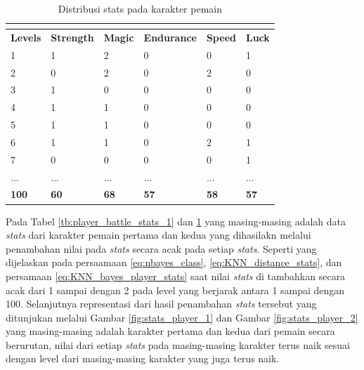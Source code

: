 \begin{longtable}{|l|l|l|l|l|l|}
	\caption{Distribusi stats pada karakter pemain}
	\vspace{1ex}
	\label{tb:player_battle_stats_2}\\
	\hline
	\rowcolor[HTML]{C0C0C0} 
	\textbf{Levels} & \textbf{Strength} & \textbf{Magic} & \textbf{Endurance} & \textbf{Speed} & \textbf{Luck} \\ \hline
	1 & 1 & 2 & 0 & 0 & 1 \\ \hline
	2 & 0 & 2 & 0 & 2 & 0 \\ \hline
	3 & 1 & 0 & 0 & 0 & 0 \\ \hline
	4 & 1 & 1 & 0 & 0 & 0 \\ \hline
	5 & 1 & 1 & 0 & 0 & 0 \\ \hline
	6 & 1 & 1 & 0 & 2 & 1 \\ \hline
	7 & 0 & 0 & 0 & 0 & 1 \\ \hline
	... & ... & ... & ... & ... & ... \\ \hline
	\textbf{100} & \textbf{60} & \textbf{68} & \textbf{57} & \textbf{58} & \textbf{57} \\ \hline
\end{longtable}
\vspace{1ex}

Pada Tabel \ref{tb:player_battle_stats_1} dan \ref{tb:player_battle_stats_2} yang masing-masing adalah data \textit{stats} dari karakter pemain pertama dan kedua yang dihasilakn melalui penambahan nilai pada \textit{stats} secara acak pada setiap \textit{stats}. Seperti yang dijelaskan pada persaamaan \ref{eq:nbayes_class}, \ref{eq:KNN_distance_stats}, dan persamaan \ref{eq:KNN_bayes_player_stats} saat nilai \textit{stats} di tambahkan secara acak dari 1 sampai dengan 2 pada level yang berjarak antara 1 sampai dengan 100. Selanjutnya representasi dari hasil penambahan \textit{stats} tersebut yang ditunjukan melalui Gambar \ref{fig:stats_player_1} dan Gambar \ref{fig:stats_player_2} yang masing-masing adalah karakter pertama dan kedua dari pemain secara berurutan, nilai dari setiap \textit{stats} pada masing-masing karakter terus naik sesuai dengan level dari masing-masing karakter yang juga terus naik. 
\vspace{1ex}

